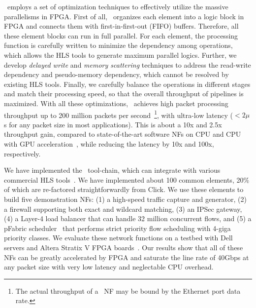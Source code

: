 \name\ employs a set of optimization techniques to effectively utilize 
the massive parallelisms in FPGA. 
First of all, \name\ organizes each element into a logic block in FPGA and 
connects them with first-in-first-out (FIFO) buffers.
Therefore, all these element blocks can run in full parallel.
For each element, the processing function is carefully written to minimize the dependency among 
operations, which allows the HLS tools to generate maximum parallel logics.
Further, we develop \textit{delayed write} and \textit{memory scattering} techniques to address
the read-write dependency and pseudo-memory dependency, which cannot be resolved by existing HLS tools.
Finally, we carefully balance the operations in different stages and match their processing speed, 
so that the overall throughput of pipelines is maximized. 
With all these optimizations, \name\ achieves high packet processing throughput 
up to 200 million packets per second~\footnote{The actual throughput of a \name\ NF may be bound by the Ethernet port data rate.}, with ultra-low latency ($< 2\mu$s for any packet size in most applications).
This is about a 10x and 2.5x throughput gain, compared to state-of-the-art software NFs on CPU and CPU with GPU acceleration~\cite{packetshader}, 
while reducing the latency by 10x and 100x, respectively.

We have implemented the \name\ tool-chain, which can integrate with various commercial HLS tools~\cite{vivado, aoc}. 
We have implemented about 100 common elements, 20\% of which are re-factored straightforwardly from Click. 
We use these elements to build five demonstration NFs: 
(1) a high-speed traffic capture and generator, 
(2) a firewall supporting both exact and wildcard matching, 
(3) an IPSec gateway,
(4) a Layer-4 load balancer that can handle 32 million concurrent flows, 
and (5) a pFabric scheduler~\cite{pfabric} that performs strict priority flow scheduling with 4-giga priority classes.
%
We evaluate these network functions on a testbed with 
Dell servers and Altera Stratix V FPGA boards~\cite{putnam2014reconfigurable}.
Our results show that all of these NFs can be greatly accelerated by FPGA and saturate the line rate of 40Gbps at 
any packet size with very low latency and neglectable CPU overhead.  

